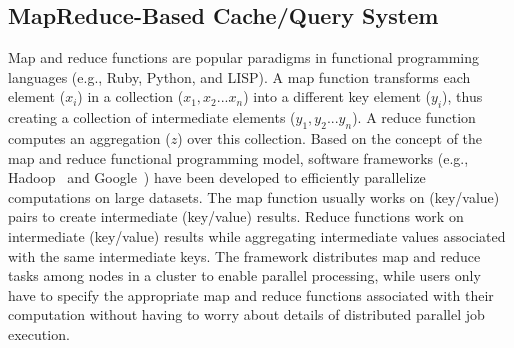 \documentclass[9.5pt,journal,final,finalsubmission,twocolumn]{IEEEtran}
\begin{document}
\subsection{MapReduce-Based Cache/Query System}\label{sec:plab_mapreduce}
Map and reduce functions are popular paradigms in functional 
programming languages (e.g., Ruby, Python, and LISP). 
A map function transforms each element ($x_i$) in a collection 
({$x_1, x_2... x_n$}) into a different key element ($y_i$), 
thus creating a collection of intermediate elements ({$y_1, y_2... y_n$}).
A reduce function computes an aggregation ($z$) over this collection. 
Based on the concept of the map and reduce functional programming model, 
software frameworks (e.g., Hadoop~\cite{hadoop} and 
Google~\cite{google_mapreduce}) have been developed to 
efficiently parallelize computations on large datasets. 
The map function usually works on (key/value) pairs to create 
intermediate (key/value) results. 
Reduce functions work on intermediate (key/value) results 
while aggregating intermediate values associated with the 
same intermediate keys. 
The framework distributes map and reduce tasks among nodes 
in a cluster to enable parallel processing, while users only 
have to specify the appropriate map and reduce functions 
associated with their computation without having to worry 
about details of distributed parallel job execution.  

\end{document}
